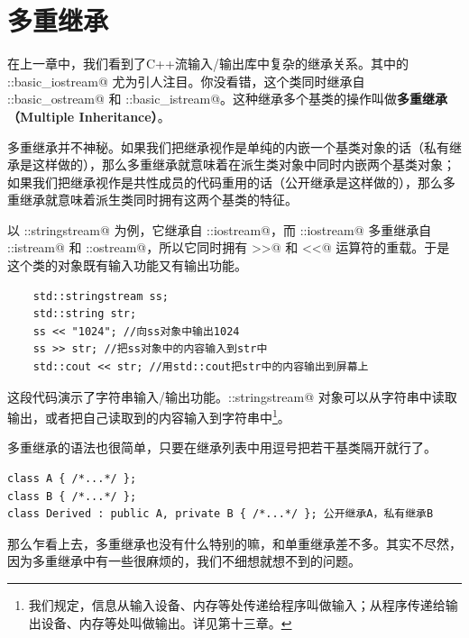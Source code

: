 \section{多重继承}
在上一章中，我们看到了C++流输入/输出库中复杂的继承关系。其中的 \lstinline@std::basic_iostream@ 尤为引人注目。你没看错，这个类同时继承自 \lstinline@std::basic_ostream@ 和 \lstinline@std::basic_istream@。这种继承多个基类的操作叫做\textbf{多重继承（Multiple Inheritance）}。\par
多重继承并不神秘。如果我们把继承视作是单纯的内嵌一个基类对象的话（私有继承是这样做的），那么多重继承就意味着在派生类对象中同时内嵌两个基类对象；如果我们把继承视作是共性成员的代码重用的话（公开继承是这样做的），那么多重继承就意味着派生类同时拥有这两个基类的特征。\par
以 \lstinline@std::stringstream@ 为例，它继承自 \lstinline@std::iostream@，而 \lstinline@std::iostream@ 多重继承自 \lstinline@std::istream@ 和 \lstinline@std::ostream@，所以它同时拥有 \lstinline@>>@ 和 \lstinline@<<@ 运算符的重载。于是这个类的对象既有输入功能又有输出功能。\par
\begin{lstlisting}
    std::stringstream ss;
    std::string str;
    ss << "1024"; //向ss对象中输出1024
    ss >> str; //把ss对象中的内容输入到str中
    std::cout << str; //用std::cout把str中的内容输出到屏幕上
\end{lstlisting}
这段代码演示了字符串输入/输出功能。\lstinline@std::stringstream@ 对象可以从字符串中读取输出，或者把自己读取到的内容输入到字符串中\footnote{我们规定，信息从输入设备、内存等处传递给程序叫做输入；从程序传递给输出设备、内存等处叫做输出。详见第十三章。}。\par
多重继承的语法也很简单，只要在继承列表中用逗号把若干基类隔开就行了。
\begin{lstlisting}
class A { /*...*/ };
class B { /*...*/ };
class Derived : public A, private B { /*...*/ }; 公开继承A，私有继承B
\end{lstlisting}\par
那么乍看上去，多重继承也没有什么特别的嘛，和单重继承差不多。其实不尽然，因为多重继承中有一些很麻烦的，我们不细想就想不到的问题。
